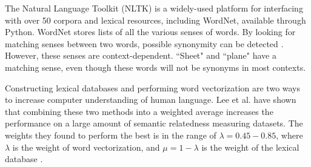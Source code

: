 \documentclass{article}
\begin{document}
The Natural Language Toolkit (NLTK) is a widely-used platform for interfacing with over 50 corpora and lexical resources, including WordNet, available through Python. WordNet stores lists of all the various senses of words. By looking for matching senses between two words, possible synonymity can be detected \cite{kilgarriff2000wordnet}. However, these senses are context-dependent. ``Sheet" and ``plane" have a matching sense, even though these words will not be synonyms in most contexts.

Constructing lexical databases and performing word vectorization are two ways to increase computer understanding of human language. Lee et al. have shown that combining these two methods into a weighted average increases the performance on a large amount of semantic relatedness measuring datasets. The weights they found to perform the best is in the range of $\lambda = 0.45-0.85$, where $\lambda$ is the weight of word vectorization, and $\mu = 1-\lambda$ is the weight of the lexical database \cite{lee2016combining}.



\end{document}
